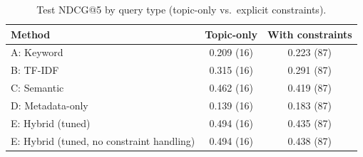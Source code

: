 \begin{table}[t]
\centering
\caption{Test NDCG@5 by query type (topic-only vs.\ explicit constraints).}
\label{tab:bytype}
\scriptsize
\begin{tabular}{lcc}
\toprule
Method & Topic-only & With constraints \\
\midrule
A: Keyword & 0.209 (16) & 0.223 (87) \\
B: TF-IDF & 0.315 (16) & 0.291 (87) \\
C: Semantic & 0.462 (16) & 0.419 (87) \\
D: Metadata-only & 0.139 (16) & 0.183 (87) \\
E: Hybrid (tuned) & 0.494 (16) & 0.435 (87) \\
E: Hybrid (tuned, no constraint handling) & 0.494 (16) & 0.438 (87) \\
\bottomrule
\end{tabular}
\end{table}

